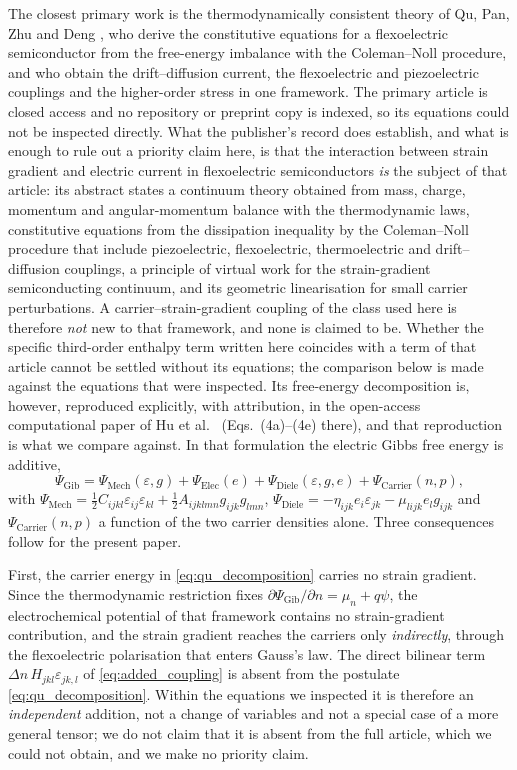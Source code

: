 The closest primary work is the thermodynamically consistent theory of Qu, Pan,
Zhu and Deng \cite{qu2025thermodynamic}, who derive the constitutive equations
for a flexoelectric semiconductor from the free-energy imbalance with the
Coleman--Noll procedure, and who obtain the drift--diffusion current, the
flexoelectric and piezoelectric couplings and the higher-order stress in one
framework.  The primary article is closed access and no repository or preprint
copy is indexed, so its equations could not be inspected directly.  What the
publisher's record does establish, and what is enough to rule out a priority
claim here, is that the interaction between strain gradient and electric current
in flexoelectric semiconductors \emph{is} the subject of that article: its
abstract states a continuum theory obtained from mass, charge, momentum and
angular-momentum balance with the thermodynamic laws, constitutive equations from
the dissipation inequality by the Coleman--Noll procedure that include
piezoelectric, flexoelectric, thermoelectric and drift--diffusion couplings, a
principle of virtual work for the strain-gradient semiconducting continuum, and
its geometric linearisation for small carrier perturbations.  A
carrier--strain-gradient coupling of the class used here is therefore
\emph{not} new to that framework, and none is claimed to be.  Whether the
specific third-order enthalpy term written here coincides with a term of that
article cannot be settled without its equations; the comparison below is made
against the equations that were inspected.  Its
free-energy
decomposition is, however, reproduced explicitly, with attribution, in the
open-access computational paper of Hu et al.\ \cite{hu2025computational}
(Eqs.~(4a)--(4e) there), and that reproduction is what we compare against.  In
that formulation the electric Gibbs free energy is additive,
\begin{equation}
\Psi_{\text{Gib}}=\Psi_{\text{Mech}}(\varepsilon,g)
+\Psi_{\text{Elec}}(e)+\Psi_{\text{Diele}}(\varepsilon,g,e)
+\Psi_{\text{Carrier}}(n,p),
\label{eq:qu_decomposition}
\end{equation}
with
$\Psi_{\text{Mech}}=\tfrac12C_{ijkl}\varepsilon_{ij}\varepsilon_{kl}
+\tfrac12A_{ijklmn}g_{ijk}g_{lmn}$,
$\Psi_{\text{Diele}}=-\eta_{ijk}e_i\varepsilon_{jk}
-\mu_{lijk}e_l g_{ijk}$ and
$\Psi_{\text{Carrier}}(n,p)$ a function of the two carrier densities alone.
Three consequences follow for the present paper.

First, the carrier energy in \eqref{eq:qu_decomposition} carries no strain
gradient.  Since the thermodynamic restriction fixes
$\partial\Psi_{\text{Gib}}/\partial n=\mu_n+q\psi$, the electrochemical potential
of that framework contains no strain-gradient contribution, and the strain
gradient reaches the carriers only \emph{indirectly}, through the flexoelectric
polarisation that enters Gauss's law.  The direct bilinear term
$\Delta n\,H_{jkl}\varepsilon_{jk,l}$ of \eqref{eq:added_coupling} is absent from
the postulate \eqref{eq:qu_decomposition}.  Within the equations we inspected it
is therefore an \emph{independent} addition, not a change of variables and not a
special case of a more general tensor; we do not claim that it is absent from
the full article, which we could not obtain, and we make no priority claim.

